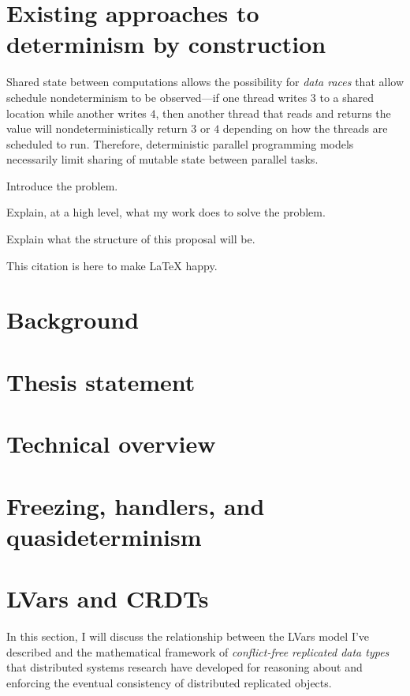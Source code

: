 \documentclass{article}
\begin{document}
\section{Existing approaches to determinism by construction}

Shared state between computations allows the possibility for
\emph{data races} that allow schedule nondeterminism to be
observed---if one thread writes $3$ to a shared location while another
writes $4$, then another thread that reads and returns the value will
nondeterministically return $3$ or $4$ depending on how the threads
are scheduled to run.  Therefore, deterministic parallel programming
models necessarily limit sharing of mutable state between parallel
tasks.


Introduce the problem.

Explain, at a high level, what my work does to solve the problem.

Explain what the structure of this proposal will be.

This citation \cite{LVars-TR} is here to make LaTeX happy.

\section{Background}

\section{Thesis statement}

\section{Technical overview}

\section{Freezing, handlers, and quasideterminism}

\section{LVars and CRDTs}

In this section, I will discuss the relationship between the LVars
model I've described and the mathematical framework of
\emph{conflict-free replicated data types} that distributed systems
research have developed for reasoning about and enforcing the eventual
consistency of distributed replicated objects.
\end{document}
